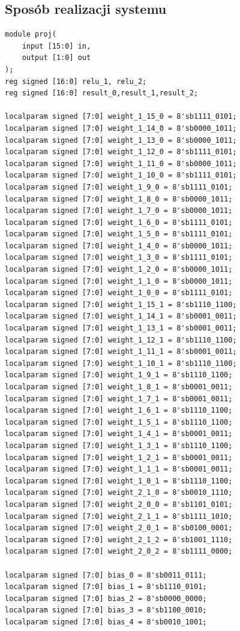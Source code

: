 \documentclass[a4paper, titleauthor]{mwart}
\begin{document}
\subsection{Sposób realizacji systemu}
\begin{lstlisting}
module proj( 
	input [15:0] in,
	output [1:0] out
);
reg signed [16:0] relu_1, relu_2;
reg signed [16:0] result_0,result_1,result_2;

localparam signed [7:0] weight_1_15_0 = 8'sb1111_0101;
localparam signed [7:0] weight_1_14_0 = 8'sb0000_1011;
localparam signed [7:0] weight_1_13_0 = 8'sb0000_1011;
localparam signed [7:0] weight_1_12_0 = 8'sb1111_0101;
localparam signed [7:0] weight_1_11_0 = 8'sb0000_1011;
localparam signed [7:0] weight_1_10_0 = 8'sb1111_0101;
localparam signed [7:0] weight_1_9_0 = 8'sb1111_0101;
localparam signed [7:0] weight_1_8_0 = 8'sb0000_1011;
localparam signed [7:0] weight_1_7_0 = 8'sb0000_1011;
localparam signed [7:0] weight_1_6_0 = 8'sb1111_0101;
localparam signed [7:0] weight_1_5_0 = 8'sb1111_0101;
localparam signed [7:0] weight_1_4_0 = 8'sb0000_1011;
localparam signed [7:0] weight_1_3_0 = 8'sb1111_0101;
localparam signed [7:0] weight_1_2_0 = 8'sb0000_1011;
localparam signed [7:0] weight_1_1_0 = 8'sb0000_1011;
localparam signed [7:0] weight_1_0_0 = 8'sb1111_0101;
localparam signed [7:0] weight_1_15_1 = 8'sb1110_1100;
localparam signed [7:0] weight_1_14_1 = 8'sb0001_0011;
localparam signed [7:0] weight_1_13_1 = 8'sb0001_0011;
localparam signed [7:0] weight_1_12_1 = 8'sb1110_1100;
localparam signed [7:0] weight_1_11_1 = 8'sb0001_0011;
localparam signed [7:0] weight_1_10_1 = 8'sb1110_1100;
localparam signed [7:0] weight_1_9_1 = 8'sb1110_1100;
localparam signed [7:0] weight_1_8_1 = 8'sb0001_0011;
localparam signed [7:0] weight_1_7_1 = 8'sb0001_0011;
localparam signed [7:0] weight_1_6_1 = 8'sb1110_1100;
localparam signed [7:0] weight_1_5_1 = 8'sb1110_1100;
localparam signed [7:0] weight_1_4_1 = 8'sb0001_0011;
localparam signed [7:0] weight_1_3_1 = 8'sb1110_1100;
localparam signed [7:0] weight_1_2_1 = 8'sb0001_0011;
localparam signed [7:0] weight_1_1_1 = 8'sb0001_0011;
localparam signed [7:0] weight_1_0_1 = 8'sb1110_1100;
localparam signed [7:0] weight_2_1_0 = 8'sb0010_1110;
localparam signed [7:0] weight_2_0_0 = 8'sb1101_0101;
localparam signed [7:0] weight_2_1_1 = 8'sb1111_1010;
localparam signed [7:0] weight_2_0_1 = 8'sb0100_0001;
localparam signed [7:0] weight_2_1_2 = 8'sb1001_1110;
localparam signed [7:0] weight_2_0_2 = 8'sb1111_0000;

localparam signed [7:0] bias_0 = 8'sb0011_0111;
localparam signed [7:0] bias_1 = 8'sb1110_0101;
localparam signed [7:0] bias_2 = 8'sb0000_0000;
localparam signed [7:0] bias_3 = 8'sb1100_0010;
localparam signed [7:0] bias_4 = 8'sb0010_1001;


\end{lstlisting}
\end{document}
